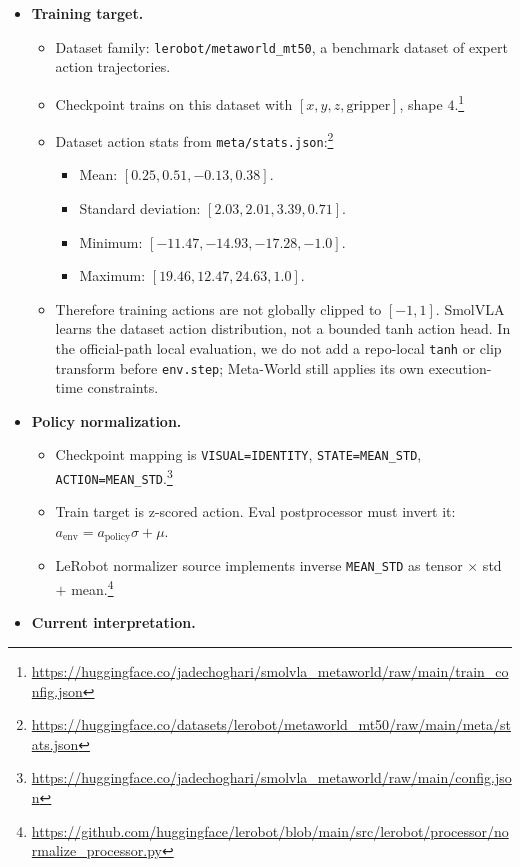 \documentclass{article}
\begin{document}
\begin{itemize}
\begin{itemize}
  \end{itemize}
  \item \textbf{Training target.}
  \begin{itemize}
    \item Dataset family: \texttt{lerobot/metaworld\_mt50}, a benchmark dataset of expert action trajectories.
    \item Checkpoint trains on this dataset with \([x,y,z,\mathrm{gripper}]\), shape \(4\).\footnote{\url{https://huggingface.co/jadechoghari/smolvla_metaworld/raw/main/train_config.json}}
    \item Dataset action stats from \texttt{meta/stats.json}:\footnote{\url{https://huggingface.co/datasets/lerobot/metaworld_mt50/raw/main/meta/stats.json}}
    \begin{itemize}
      \item Mean: \([0.25,0.51,-0.13,0.38]\).
      \item Standard deviation: \([2.03,2.01,3.39,0.71]\).
      \item Minimum: \([-11.47,-14.93,-17.28,-1.0]\).
      \item Maximum: \([19.46,12.47,24.63,1.0]\).
    \end{itemize}
    \item Therefore training actions are not globally clipped to \([-1,1]\).  SmolVLA learns the dataset action distribution, not a bounded tanh action head.  In the official-path local evaluation, we do not add a repo-local \texttt{tanh} or clip transform before \texttt{env.step}; Meta-World still applies its own execution-time constraints.
  \end{itemize}
  \item \textbf{Policy normalization.}
  \begin{itemize}
    \item Checkpoint mapping is \texttt{VISUAL=IDENTITY}, \texttt{STATE=MEAN\_STD}, \texttt{ACTION=MEAN\_STD}.\footnote{\url{https://huggingface.co/jadechoghari/smolvla_metaworld/raw/main/config.json}}
    \item Train target is z-scored action.  Eval postprocessor must invert it: \(a_{\mathrm{env}} = a_{\mathrm{policy}}\sigma+\mu\).
    \item LeRobot normalizer source implements inverse \texttt{MEAN\_STD} as tensor \(\times\) std \(+\) mean.\footnote{\url{https://github.com/huggingface/lerobot/blob/main/src/lerobot/processor/normalize_processor.py}}
  \end{itemize}
  \item \textbf{Current interpretation.}

\end{itemize}
\end{document}
